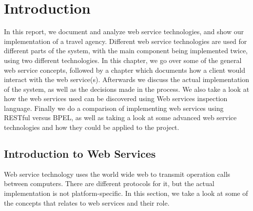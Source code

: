 \chapter{Introduction}
In this report, we document and analyze web service technologies, and show our implementation of a travel agency. Different web service technologies are used for different parts of the system, with the main component being implemented twice, using two different technologies. In this chapter, we go over some of the general web service concepts, followed by a chapter which documents how a client would interact with the web service(s). Afterwards we discuss the actual implementation of the system, as well as the decisions made in the process. We also take a look at how the web services used can be discovered using Web services inspection language. Finally we do a comparison of implementing web services using RESTful versus BPEL, as well as taking a look at some advanced web service technologies and how they could be applied to the project.


\section{Introduction to Web Services}

Web service technology uses the world wide web to transmit operation calls between computers. There are different protocols for it, but the actual implementation is not platform-specific. In this section, we take a look at some of the concepts that relates to web services and their role. 


